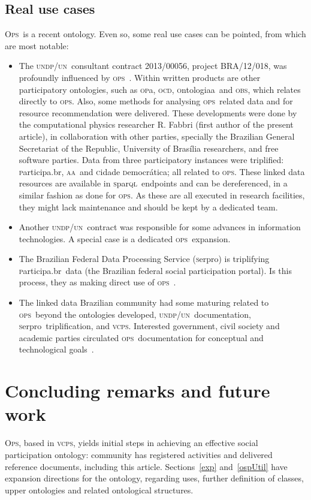 \documentclass[10pt,letterpaper]{article}
\newcommand{\ops}{\textsc{ops}}
\newcommand{\opsi}{O\textsc{ps}}
\newcommand{\vcps}{\textsc{vcps}}
\newcommand{\sparql}{\textsc{s}par\textsc{ql}}
\newcommand{\opa}{\textsc{op}a}
\newcommand{\ocd}{\textsc{ocd}}
\newcommand{\ontologiaa}{\textsc{o}ntologiaa}
\newcommand{\obs}{\textsc{obs}}
\newcommand{\aan}{\textsc{aa}}
\newcommand{\cidadedemocratica}{\textsc{c}idade \textsc{d}emocr\'atica}
\newcommand{\participa}{\textsc{p}articipa.br}
\newcommand{\pnud}{\textsc{undp}}
\newcommand{\onu}{\textsc{un}}
\newcommand{\serpro}{\textsc{s}erpro}
\begin{document}
\subsection{Real use cases}\label{sec:real}
\opsi\ is a recent ontology. Even so, some real use cases can be pointed, from which are most notable:
\begin{itemize}
    \item The \pnud/\onu\ consultant contract 2013/00056, project BRA/12/018, was profoundly influenced by \ops~\cite{pnud5}. Within written products are other participatory ontologies, such as \opa, \ocd, \ontologiaa\ and \obs, which relates directly to \ops. Also, some methods for analysing \ops\ related data and for resource recommendation were delivered. These developments were done by the computational physics researcher R. Fabbri (first author of the present article), in collaboration with other parties, specially the Brazilian General Secretariat of the Republic, University of Bras\'ilia researchers, and free software parties. Data from three participatory instances were triplified: \participa, \aan\ and \cidadedemocratica; all related to \ops. These linked data resources are available in \sparql\ endpoints and can be dereferenced, in a similar fashion as done for \ops. As these are all executed in research facilities, they might lack maintenance and should be kept by a dedicated team.
    \item Another \pnud/\onu\ contract was responsible for some advances in information technologies. A special case is a dedicated \ops\ expansion\cite{paulo6}.
    \item The Brazilian Federal Data Processing Service (\serpro) is triplifying \participa\ data (the Brazilian federal social participation portal). Is this process, they as making direct use of \ops~\cite{tripSerpro}.
    \item The linked data Brazilian community had some maturing related to \ops\ beyond the ontologies developed, \pnud/\onu\ documentation, \serpro\ triplification, and \vcps. Interested government, civil society and academic parties circulated \ops\ documentation for conceptual and technological goals~\cite{circulaOps1,circulaOps2}.
\end{itemize}

\section{Concluding remarks and future work}\label{conc}
\opsi, based in \vcps,
yields initial steps in achieving an effective social participation ontology: community has registered activities and delivered reference documents, including this article.
Sections~\ref{exp} and~\ref{ospUtil} have expansion directions for the ontology, regarding uses, further definition of classes, upper ontologies and related ontological structures.
\end{document}
